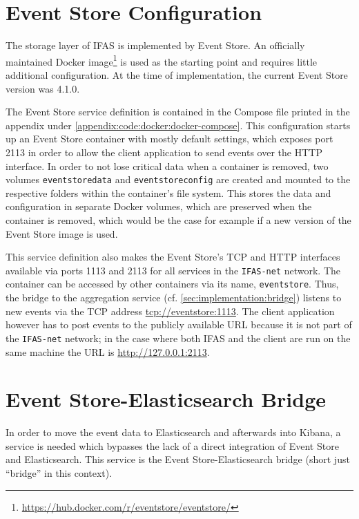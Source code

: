 \section{Event Store Configuration}
\label{sec:implementation:storage}

The storage layer of \ac{IFAS} is implemented by Event Store.
An officially maintained Docker image\footnote{\url{https://hub.docker.com/r/eventstore/eventstore/}} is used as the starting point and requires little additional configuration.
At the time of implementation, the current Event Store version was 4.1.0.

The Event Store service definition is contained in the Compose file printed in the appendix under \cref{appendix:code:docker:docker-compose}.
This configuration starts up an Event Store container with mostly default settings, which exposes port 2113 in order to allow the client application to send events over the \ac{HTTP} interface.
In order to not lose critical data when a container is removed, two volumes \texttt{eventstoredata} and \texttt{eventstoreconfig} are created and mounted to the respective folders within the container's file system.
This stores the data and configuration in separate Docker volumes, which are preserved when the container is removed, which would be the case for example if a new version of the Event Store image is used.

This service definition also makes the Event Store's \ac{TCP} and \ac{HTTP} interfaces available via ports 1113 and 2113 for all services in the \texttt{IFAS-net} network.
The container can be accessed by other containers via its name, \texttt{eventstore}.
Thus, the bridge to the aggregation service (cf. \cref{sec:implementation:bridge}) listens to new events via the \ac{TCP} address \url{tcp://eventstore:1113}.
The client application however has to post events to the publicly available URL because it is not part of the \texttt{IFAS-net} network; in the case where both \ac{IFAS} and the client are run on the same machine the URL is \url{http://127.0.0.1:2113}.

\section{Event Store-Elasticsearch Bridge}
\label{sec:design:bridge}
\label{sec:implementation:bridge}

In order to move the event data to Elasticsearch and afterwards into Kibana, a service is needed which bypasses the lack of a direct integration of Event Store and Elasticsearch.
This service is the Event Store-Elasticsearch bridge (short just ``bridge'' in this context).

